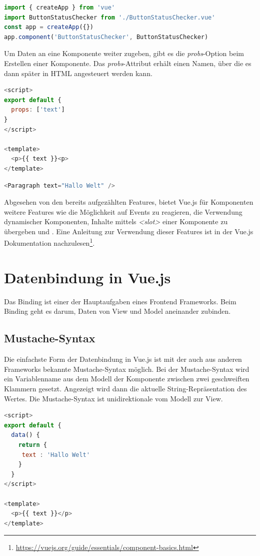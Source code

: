 
\begin{lstlisting}[caption={Globale Registrierung einer Komponente},language=javascript,label={lst:Globale Registrierung}]
import { createApp } from 'vue'
import ButtonStatusChecker from './ButtonStatusChecker.vue'
const app = createApp({})
app.component('ButtonStatusChecker', ButtonStatusChecker)
\end{lstlisting}


Um Daten an eine Komponente weiter zugeben, gibt es die \emph{probs}-Option beim Erstellen einer Komponente.
Das \emph{probs}-Attribut erhält einen Namen, über die es dann später in
HTML angesteuert werden kann. \cite{vueComponents}

\newpage

\begin{lstlisting}[caption={Erstellung eines \emph{probs}},language=javascript,label={lst:Erstellung eines probs}]
<script>
export default {
  props: ['text']
}
</script>

<template>
  <p>{{ text }}<p>
</template>
\end{lstlisting}

\begin{lstlisting}[caption={Nutzung eines \emph{probs}},language=javascript,label={lst:Nutzung eines probs}]
<Paragraph text="Hallo Welt" />
\end{lstlisting}

Abgesehen von den bereits aufgezählten Features, bietet Vue.js für Komponenten weitere Features wie die Möglichkeit auf Events zu reagieren,
die Verwendung dynamischer Komponenten, Inhalte mittels \emph{<slot>} einer Komponente zu übergeben und .
Eine Anleitung zur Verwendung dieser Features ist in der Vue.js Dokumentation nachzulesen\footnote{\url{https://vuejs.org/guide/essentials/component-basics.html}}.
\cite{vueComponents}


\section{Datenbindung in Vue.js}\label{sec:datenbindung-in-vue.js}
Das Binding ist einer der Hauptaufgaben eines Frontend Frameworks.
Beim Binding geht es darum, Daten von View und Model aneinander zubinden. \cite[S. 11]{steyer2019}
\subsection*{Mustache-Syntax}
Die einfachste Form der Datenbindung in Vue.js ist mit der auch aus anderen Frameworks bekannte Mustache-Syntax möglich.
Bei der Mustache-Syntax wird ein Variablenname aus dem Modell der Komponente zwischen zwei geschweiften Klammern gesetzt.
Angezeigt wird dann die aktuelle String-Repräsentation des Wertes.
Die Mustache-Syntax ist unidirektionale vom Modell zur View. \cite{vueTemplateSyntax}
\begin{lstlisting}[caption={Mustache-Syntax},language=javascript, label={lst:Mustache-Syntax}]
<script>
export default {
  data() {
    return {
     text : 'Hallo Welt'
    }
  }
</script>

<template>
  <p>{{ text }}</p>
</template>
\end{lstlisting}

